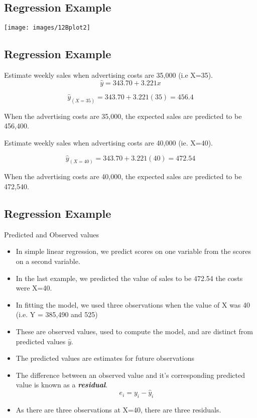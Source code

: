 \documentclass[]{report}
\begin{document}
	
	
	\subsection{Regression Example}
	\begin{center}
		\texttt{[image: images/12Bplot2]}
	\end{center}
	
	
	
	\subsection{Regression Example}
	Estimate weekly sales when advertising costs are 35,000 (i.e X=35).
	\[ \hat{y} = 343.70 + 3.221x \]
	
	\[ \hat{y}_{(X=35)} = 343.70 + 3.221(35)  = 456.4 \]
	
	When the advertising costs are 35,000, the expected sales are predicted to be 456,400.
	
	Estimate weekly sales when advertising costs are 40,000 (ie. X=40).
	
	
	\[ \hat{y}_{(X=40)} = 343.70 + 3.221(40)  = 472.54 \]
	
	When the advertising costs are 40,000, the expected sales are predicted to be 472,540.
	
	
	\subsection{Regression Example}
	
	Predicted and Observed values
	\begin{itemize}
		\item In simple linear regression, we predict scores on one variable from the scores on a second variable.
		\item In the last example, we predicted the value of sales to be 472.54 the costs were X=40.
		\item In fitting the model, we used three observations when the value of X was 40 (i.e. Y = 385,490 and 525)
		\item These are observed values, used to compute the model, and are distinct from predicted values $\hat{y}$.
		\item The predicted values are estimates for future observations
		\item The difference between an observed value and it's corresponding predicted value is known as a \textbf{\textit{residual}}.
		\[e_i = y_i-\hat{y}_i \]
		\item As there are three observations at X=40, there are three residuals.
	\end{itemize}
	
\end{document}
